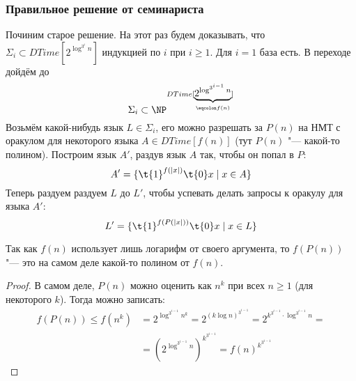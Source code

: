	\subsubsection{Правильное решение от семинариста}
		Починим старое решение.
		На этот раз будем доказывать, что $\Sigma_i \subset DTime[2^{\log^{3^i} n}]$ индукцией по $i$ при $i\ge 1$.
		Для $i = 1$ база есть.
		В переходе дойдём до
		\[ \Sigma_i \subset \NP^{DTime[\underbrace{2^{\log^{3^{i-1}} n}}_{\eqcolon f(n)}]} \]
		Возьмём какой-нибудь язык $L\in\Sigma_i$, его можно разрешать за $P(n)$ на НМТ
		с оракулом для некоторого языка $A \in DTime[f(n)]$ (тут $P(n)$ "--- какой-то полином).
		Построим язык $A'$, раздув язык $A$ так, чтобы он попал в $P$:
		\[ A' = \{ \t{1}^{f(|x|)}\t{0}x \mid x \in A \} \]
		Теперь раздуем раздуем $L$ до $L'$, чтобы успевать делать запросы к оракулу для языка $A'$:
		\[
			L' = \{ \t{1}^{f(P(|x|))}\t{0} x \mid x \in L \}
		\]
		\begin{assertion}
			Так как $f(n)$ использует лишь логарифм от своего аргумента, то $f(P(n))$ "--- это на
			самом деле какой-то полином от $f(n)$.
		\end{assertion}
		\begin{proof}
			В самом деле, $P(n)$ можно оценить как $n^k$ при всех $n \ge 1$ (для некоторого $k$).
			Тогда можно записать:
			\begin{align*}
				f(P(n)) \le
				f(n^k) &=
					2^{\log^{3^{i-1}} n^k} =
					2^{(k\log n)^{3^{i-1}}} =
					2^{k^{3^{i-1}} \cdot \log^{3^{i-1}} n} = \\
					&= \left(2^{\log^{3^{i-1}} n}\right)^{k^{3^{i-1}}} =
					f(n)^{k^{3^{i-1}}}
			\end{align*}
		\end{proof}

